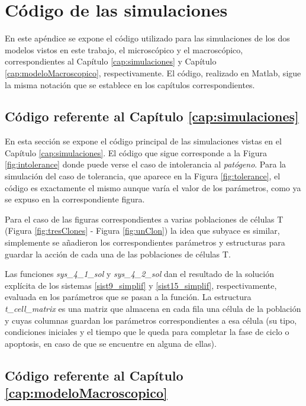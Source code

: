 \chapter{Código de las simulaciones}
\label{Appendix:A}

En este apéndice se expone el código utilizado para las simulaciones de los dos modelos vistos en este trabajo, el microscópico y el macroscópico, correspondientes al Capítulo \ref{cap:simulaciones} y Capítulo \ref{cap:modeloMacroscopico}, respectivamente. El código, realizado en Matlab, sigue la misma notación que se establece en los capítulos correspondientes.

\section{Código referente al Capítulo \ref{cap:simulaciones}}
\label{sec:codigoMicro}
En esta sección se expone el código principal de las simulaciones vistas en el Capítulo \ref{cap:simulaciones}. El código que sigue corresponde a la Figura \ref{fig:intolerance} donde puede verse el caso de intolerancia al \textit{patógeno}. Para la simulación del caso de tolerancia, que aparece en la Figura \ref{fig:tolerance}, el código es exactamente el mismo aunque varía el valor de los parámetros, como ya se expuso en la correspondiente figura. 

Para el caso de las figuras correspondientes a varias poblaciones de células T (Figura \ref{fig:tresClones} - Figura \ref{fig:unClon}) la idea que subyace es similar, simplemente se añadieron los correspondientes parámetros y estructuras para guardar la acción de cada una de las poblaciones de células T. 

Las funciones \textit{sys\_4\_1\_sol} y \textit{sys\_4\_2\_sol} dan el resultado de la solución explícita de los sistemas \ref{sist9_simplif} y \ref{sist15_simplif}, respectivamente, evaluada en los parámetros que se pasan a la función. La estructura \textit{t\_cell\_matrix} es una matriz que almacena en cada fila una célula de la población y cuyas columnas guardan los parámetros correspondientes a esa célula (su tipo, condiciones iniciales y el tiempo que le queda para completar la fase de ciclo o apoptosis, en caso de que se encuentre en alguna de ellas). 




\section{Código referente al Capítulo \ref{cap:modeloMacroscopico}}
\label{sec:codigoMacro}

